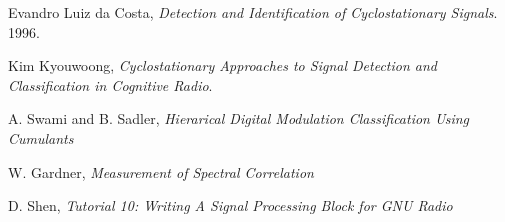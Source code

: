 \begin{thebibliography}{9}

  Evandro Luiz da Costa,
  \emph{Detection and Identification of Cyclostationary Signals}.
  1996.

  Kim Kyouwoong,
  \emph{Cyclostationary Approaches to Signal Detection and Classification in
  Cognitive Radio}.

  A. Swami and B. Sadler,
  \emph{Hierarical Digital Modulation Classification Using Cumulants}
  
  W. Gardner,
  \emph{Measurement of Spectral Correlation}

  D. Shen,
  \emph{Tutorial 10: Writing A Signal Processing Block for GNU Radio}


\end{thebibliography}